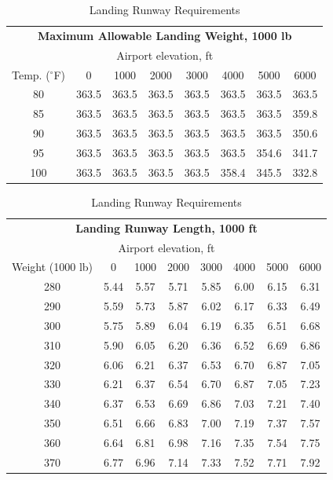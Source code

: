 \documentclass{KPS_assignment}
\begin{document}
\begin{table}[h!]
\centering
\caption{Landing Runway Requirements}
\small
\begin{tabular}{c|ccccccc}
\hline
\multicolumn{8}{c}{\textbf{Maximum Allowable Landing Weight, 1000 lb}} \\
\multicolumn{8}{c}{Airport elevation, ft} \\
Temp. ($^\circ$F) & 0 & 1000 & 2000 & 3000 & 4000 & 5000 & 6000 \\
\hline
80  & 363.5 & 363.5 & 363.5 & 363.5 & 363.5 & 363.5 & 363.5 \\
85  & 363.5 & 363.5 & 363.5 & 363.5 & 363.5 & 363.5 & 359.8 \\
90  & 363.5 & 363.5 & 363.5 & 363.5 & 363.5 & 363.5 & 350.6 \\
95  & 363.5 & 363.5 & 363.5 & 363.5 & 363.5 & 354.6 & 341.7 \\
100 & 363.5 & 363.5 & 363.5 & 363.5 & 358.4 & 345.5 & 332.8 \\
\hline
\end{tabular}

\vspace{0.5cm}

\begin{tabular}{c|ccccccc}
\hline
\multicolumn{8}{c}{\textbf{Landing Runway Length, 1000 ft}} \\
\multicolumn{8}{c}{Airport elevation, ft} \\
Weight (1000 lb) & 0 & 1000 & 2000 & 3000 & 4000 & 5000 & 6000 \\
\hline
280 & 5.44 & 5.57 & 5.71 & 5.85 & 6.00 & 6.15 & 6.31 \\
290 & 5.59 & 5.73 & 5.87 & 6.02 & 6.17 & 6.33 & 6.49 \\
300 & 5.75 & 5.89 & 6.04 & 6.19 & 6.35 & 6.51 & 6.68 \\
310 & 5.90 & 6.05 & 6.20 & 6.36 & 6.52 & 6.69 & 6.86 \\
320 & 6.06 & 6.21 & 6.37 & 6.53 & 6.70 & 6.87 & 7.05 \\
330 & 6.21 & 6.37 & 6.54 & 6.70 & 6.87 & 7.05 & 7.23 \\
340 & 6.37 & 6.53 & 6.69 & 6.86 & 7.03 & 7.21 & 7.40 \\
350 & 6.51 & 6.66 & 6.83 & 7.00 & 7.19 & 7.37 & 7.57 \\
360 & 6.64 & 6.81 & 6.98 & 7.16 & 7.35 & 7.54 & 7.75 \\
370 & 6.77 & 6.96 & 7.14 & 7.33 & 7.52 & 7.71 & 7.92 \\
\hline
\end{tabular}


\end{table}
\end{document}
